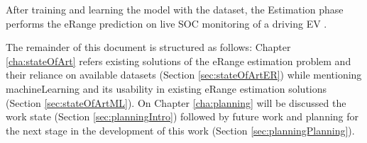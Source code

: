 After training and learning the model with the \gls{dataset},
the Estimation phase performs the \gls{eRange} prediction
on live \gls{SOC} monitoring of a driving \gls{EV}
.

The remainder of this document is structured as follows: 
Chapter \ref{cha:stateOfArt} refers existing solutions 
of the \gls{eRange} estimation problem and their reliance on available
\glspl{dataset} (Section \ref{sec:stateOfArtER}) while
mentioning \gls{machineLearning} and its usability 
in existing \gls{eRange} estimation solutions 
(Section \ref{sec:stateOfArtML}).
On Chapter \ref{cha:planning} will be discussed the 
work state (Section \ref{sec:planningIntro}) followed by 
future work and planning for the next stage 
in the development of this work 
(Section \ref{sec:planningPlanning}). 